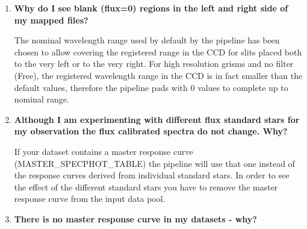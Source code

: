 \begin{enumerate}
\begin{itemize}
One can change the wavelength range in the interactive window of the {\bf calibration\_std} task , by editing the {\tt startwavelength} and/or {\tt endwavelength} values or by specifying these parameters on the command line.

\item (b) If the new response determination was used (recipe {bf fors\_response}).
The response is computed by using fit-points defined in the table with the tag FIT\_POINT\_CATALOG, and they cover only the wavelength region unaffected by second order contamination. To extend the
wavelength range it is therefore necessary to edit the table before starting the reduction and insert extra fit points according to the needs.

\end{itemize}

When extending the wavelength range for the flux standard star (to get flux-calibrated spectra across the extended wavelength range) please note that many flux standard stars are hot stars, for which the second order contamination may distort the response shape.
Note also, that if master response curves are used, only the wavelength range without second order contamination is covered.

\item {\bf Why do I see blank (flux=0) regions in the left and right side of my mapped files?}

The nominal wavelength range used by default by the pipeline has been chosen to allow covering the registered range in the CCD for slits placed both to the very left or to the very right. For high resolution grisms and no filter (Free), the registered wavelength range in the CCD is in fact smaller than the default
values, therefore the pipeline pads with 0 values to complete up to nominal range.

\item {\bf Although I am experimenting with different flux standard stars for my observation the flux calibrated spectra do not change. Why?}

If your dataset contains a master response curve (MASTER\_SPECPHOT\_TABLE) the pipeline will use that one instead of the response curves derived from individual standard stars. In order to see the effect of the different standard stars you have to remove the master response curve from the input data pool.

\item {\bf There is no master response curve in my datasets - why?}


\end{enumerate}
